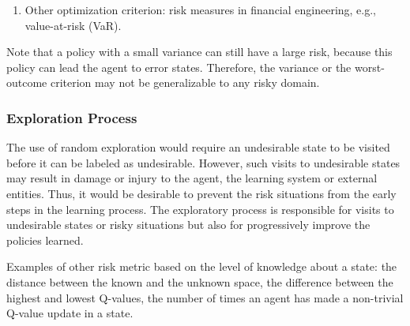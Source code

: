 \begin{enumerate}
\item
	Other optimization criterion: risk measures in financial engineering, e.g., value-at-risk (VaR).	
\end{enumerate}

Note that a policy with a small variance can still have a large risk, because this policy can lead the agent to error states. Therefore, the variance or the worst-outcome criterion may not be generalizable to any risky domain. 

\subsubsection{Exploration Process}
The use of random exploration would require an undesirable state to be visited before it can be labeled as undesirable. However, such visits to undesirable states may result in damage or injury to the agent, the learning system or external entities. Thus, it would be desirable to prevent the risk situations from the early steps in the learning process. The exploratory process is responsible for visits to undesirable states or risky situations but also for progressively improve the policies learned.
 
Examples of other risk metric based on the level of knowledge about a state: the distance between the known and the unknown space, the difference between the highest and lowest Q-values, the number of times an agent has made a non-trivial Q-value update in a state.

